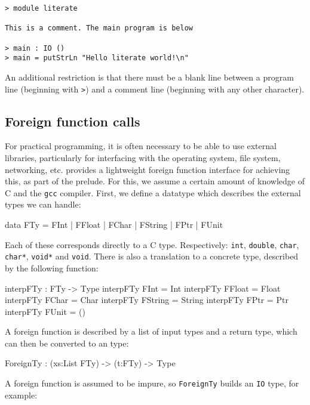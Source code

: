 \begin{lstlisting}
> module literate

This is a comment. The main program is below

> main : IO ()
> main = putStrLn "Hello literate world!\n"
\end{lstlisting}

\noindent
An additional restriction is that there must be a blank line between a program
line (beginning with \texttt{>}) and a comment line (beginning with any other
character).

\subsection{Foreign function calls}

For practical programming, it is often necessary to be able to use external libraries,
particularly for interfacing with the operating system, file system, networking, etc.
\Idris{} provides a lightweight foreign function interface for achieving this,
as part of the prelude. For this, we assume a certain amount of knowledge of
C and the \texttt{gcc} compiler. First, we define a datatype which describes the external
types we can handle:

\begin{code}
data FTy = FInt | FFloat | FChar | FString | FPtr | FUnit
\end{code}

\noindent
Each of these corresponds directly to a C type. Respectively: \texttt{int},
\texttt{double}, \texttt{char}, \texttt{char*}, \texttt{void*} and \texttt{void}.
There is also a translation to a concrete \Idris{} type, described by the
following function:

\begin{code}
interpFTy : FTy -> Type
interpFTy FInt    = Int
interpFTy FFloat  = Float
interpFTy FChar   = Char
interpFTy FString = String
interpFTy FPtr    = Ptr
interpFTy FUnit   = ()
\end{code}

\noindent
A foreign function is described by a list of input types and a return type, which
can then be converted to an \Idris{} type:

\begin{code}
ForeignTy : (xs:List FTy) -> (t:FTy) -> Type
\end{code}

\noindent
A foreign function is assumed to be impure, so \texttt{ForeignTy} builds an
\texttt{IO} type, for example:

